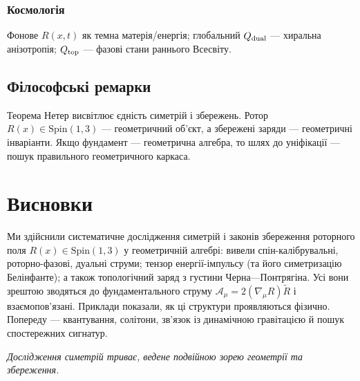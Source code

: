 \documentclass[11pt,a4paper]{article}
\numberwithin{equation}{section}
\theoremstyle{plain}
\theoremstyle{definition}
\theoremstyle{remark}
\newif\ifack
\begin{document}
\subsubsection{Космологія}

Фонове $R(x,t)$ як темна матерія/енергія; глобальний $Q_{\rm dual}$ — хиральна анізотропія; $Q_{\rm top}$ — фазові стани раннього Всесвіту.

\subsection{Філософські ремарки}

Теорема Нетер висвітлює єдність симетрій і збережень. Ротор $R(x)\in \mathrm{Spin}(1,3)$ — геометричний об’єкт, а збережені заряди — геометричні інваріанти. Якщо фундамент — геометрична алгебра, то шлях до уніфікації — пошук правильного геометричного каркаса.

\section{Висновки}
\label{sec:conclusion}

Ми здійснили систематичне дослідження симетрій і законів збереження роторного поля $R(x)\in\mathrm{Spin}(1,3)$ у геометричній алгебрі: вивели спін-калібрувальні, роторно-фазові, дуальні струми; тензор енергії-імпульсу (та його симетризацію Белінфанте); а також топологічний заряд з густини Черна—Понтрягіна. Усі вони зрештою зводяться до фундаментального струму $\mathcal{A}_\mu=2(\nabla_\mu R)\widetilde{R}$ і взаємопов’язані. Приклади показали, як ці структури проявляються фізично. Попереду — квантування, солітони, зв’язок із динамічною гравітацією й пошук спостережних сигнатур.

\medskip
\noindent\textit{Дослідження симетрій триває, ведене подвійною зорею геометрії та збереження.}

\ifack
\section*{Подяки}
Автор завдячує Еммі Нетер, чия теорема вела покоління фізиків. Розвиток геометричної алгебри Девідом Гестенесом і її застосування до гравітації Ентоні Лазенбі, Крісом Дораном та Стівеном Галлом стали наріжними каменями. Роботу виконано незалежно, без зовнішнього фінансування. За можливі похибки відповідає автор.
\fi
\end{document}
